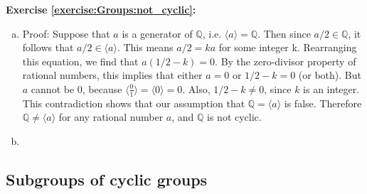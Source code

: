 \noindent\textbf{Exercise \ref{exercise:Groups:not_cyclic}:}
\begin{enumerate}[(a)]
\item
Proof:
Suppose that $a$ is a generator of $\mathbb{Q}$, i.e. $\langle a \rangle = \mathbb{Q}$.  Then since $a/2 \in  \mathbb{Q}$, it follows that  $a/2 \in \langle a \rangle$. This means $a/2 =ka$ for some integer k.  Rearranging this equation, we find that $a(1/2-k)=0$.  By the zero-divisor property of rational numbers, this implies that either $a=0$ or $1/2-k = 0$ (or both). But $a$ cannot be 0, because $\langle \frac{0}{1} \rangle = \langle 0 \rangle = 0$.  Also, $1/2-k \neq 0$, since $k$ is an integer.  This contradiction shows that  our assumption that ${\mathbb Q} = \langle a \rangle$ is false. Therefore ${\mathbb Q} \neq \langle a \rangle$ for any rational number $a$, and ${\mathbb Q}$ is not cyclic.

\item
\end{enumerate}

 
\subsection{Subgroups of cyclic groups}
